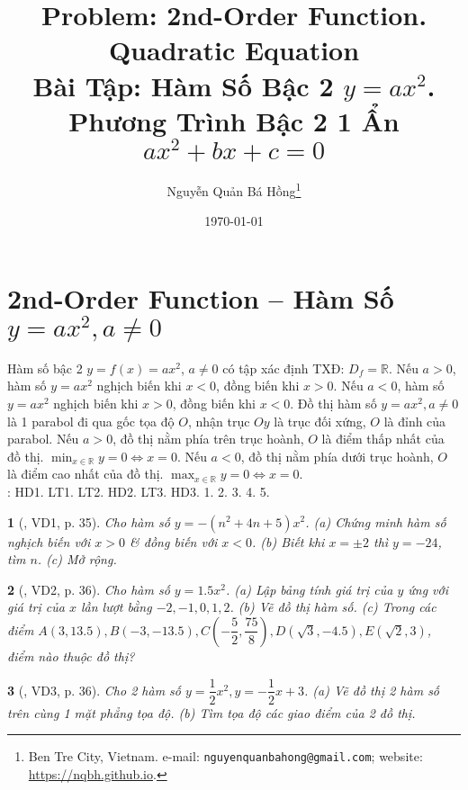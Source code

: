 \documentclass{article}
\title{Problem: 2nd-Order Function. Quadratic Equation\\Bài Tập: Hàm Số Bậc 2 $y = ax^2$. Phương Trình Bậc 2 1 Ẩn $ax^2 + bx + c = 0$}
\author{Nguyễn Quản Bá Hồng\footnote{Ben Tre City, Vietnam. e-mail: \texttt{nguyenquanbahong@gmail.com}; website: \url{https://nqbh.github.io}.}}
\date{\today}
\newtheorem{baitoan}{}
\begin{document}
\maketitle
\tableofcontents


\section{2nd-Order Function -- Hàm Số $y = ax^2,a\ne0$}
 Hàm số bậc 2 $y = f(x) = ax^2$, $a\ne0$ có tập xác định TXĐ: $D_f = \mathbb{R}$. Nếu $a > 0$, hàm số $y = ax^2$ nghịch biến khi $x < 0$, đồng biến khi $x > 0$. Nếu $a < 0$, hàm số $y = ax^2$ nghịch biến khi $x > 0$, đồng biến khi $x < 0$.  Đồ thị hàm số $y = ax^2,a\ne0$ là 1 parabol đi qua gốc tọa độ $O$, nhận trục $Oy$ là trục đối xứng, $O$ là đỉnh của parabol. Nếu $a > 0$, đồ thị nằm phía trên trục hoành, $O$ là điểm thấp nhất của đồ thị. $\min_{x\in\mathbb{R}} y = 0\Leftrightarrow x = 0$. Nếu $a < 0$, đồ thị nằm phía dưới trục hoành, $O$ là điểm cao nhất của đồ thị. $\max_{x\in\mathbb{R}} y = 0\Leftrightarrow x = 0$.\\

\noindent\cite[Chap. VII, \S1, pp. 46--51]{SGK_Toan_9_Canh_Dieu_tap_2}: HD1. LT1. LT2. HD2. LT3. HD3. 1. 2. 3. 4. 5.

\begin{baitoan}[\cite{Binh_boi_duong_Toan_9_tap_2}, VD1, p. 35]
	Cho hàm số $y = -(n^2 + 4n + 5)x^2$. (a) Chứng minh hàm số nghịch biến với $x > 0$ \& đồng biến với $x < 0$. (b) Biết khi $x = \pm2$ thì $y = -24$, tìm $n$. (c) Mở rộng.
\end{baitoan}

\begin{baitoan}[\cite{Binh_boi_duong_Toan_9_tap_2}, VD2, p. 36]
	Cho hàm số $y = 1.5x^2$. (a) Lập bảng tính giá trị của $y$ ứng với giá trị của $x$ lần lượt bằng $-2,-1,0,1,2$. (b) Vẽ đồ thị hàm số. (c) Trong các điểm $A(3,13.5),B(-3,-13.5),C\left(-\dfrac{5}{2},\dfrac{75}{8}\right),D(\sqrt{3},-4.5),E(\sqrt{2},3)$, điểm nào thuộc đồ thị?
\end{baitoan}

\begin{baitoan}[\cite{Binh_boi_duong_Toan_9_tap_2}, VD3, p. 36]
	Cho 2 hàm số $y = \dfrac{1}{2}x^2,y = -\dfrac{1}{2}x + 3$. (a) Vẽ đồ thị 2 hàm số trên cùng 1 mặt phẳng tọa độ. (b) Tìm tọa độ các giao điểm của 2 đồ thị.
\end{baitoan}
\end{document}
